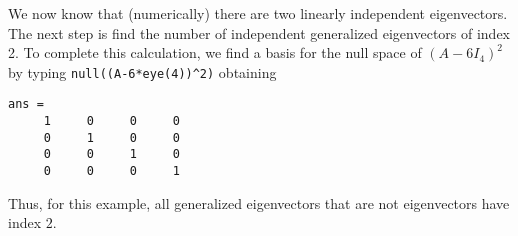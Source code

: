\documentclass{ximera}
\begin{document}
We now know that (numerically) there are two linearly independent
eigenvectors.  The next step is find the number of independent generalized 
eigenvectors of index 2.  To complete this calculation, we find 
a basis for the null space of $(A-6I_4)^2$ by typing 
{\tt null((A-6*eye(4))\^{ }2)} obtaining
\begin{verbatim}
ans =
     1     0     0     0
     0     1     0     0
     0     0     1     0
     0     0     0     1
\end{verbatim}
Thus, for this example, all generalized eigenvectors that are not
eigenvectors have index $2$.



\end{document}
